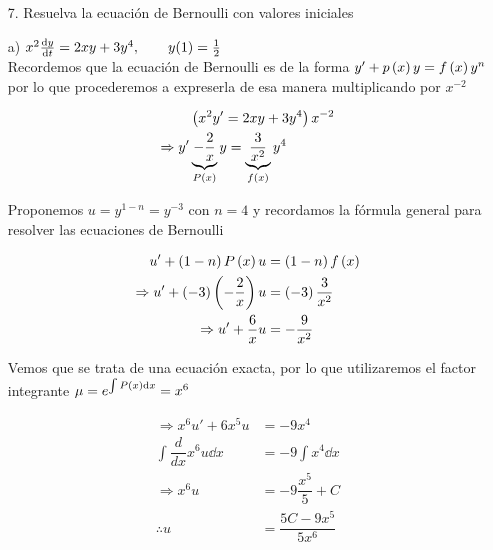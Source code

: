 \begin{enumerate}
    \item[7.] Resuelva la ecuación de Bernoulli con valores iniciales
\end{enumerate}
  
   \begin{itemize}
       \item[a)]   $x^{2} \dv{y}{t} = 2xy + 3y^{4}, \qquad y(1)=\frac{1}{2}$\\
       Recordemos que la ecuación de Bernoulli es de la forma $y'+p\left( x \right)y=f\left( x \right)y^n$ por lo que procederemos a expreserla de esa manera multiplicando por $x^{-2}$
       
       \begin{align*}
           &\left(x^2 y' = 2xy+3y^4\right)x^{-2} \\
           \Rightarrow y'&\underbrace{-\dfrac{2}{x}}_{P(x)}y=\underbrace{\dfrac{3}{x^2}}_{f\left( x \right)}y^4
       \end{align*}
       
       Proponemos $u=y^{1-n}=y^{-3}$ con $n=4$ y recordamos la fórmula general para resolver las ecuaciones de Bernoulli
       
       \begin{align*}
           u'+\left( 1-n \right)P\left( x \right) u &= \left( 1-n \right)f\left( x \right) \\
           \Rightarrow u' + \left( -3 \right) \left( -\dfrac{2}{x} \right)u&=\left( -3 \right)\dfrac{3}{x^2} \\
           \Rightarrow u'+\dfrac{6}{x} u &= -\dfrac{9}{x^2}
       \end{align*}
       
       Vemos que se trata de una ecuación exacta, por lo que utilizaremos el factor integrante $\mu=e^{\int P\left( x \right) \dd x}=x^6$

    \begin{align*}
        \Rightarrow  x^6u'+6x^5u&=-9x^4 \\ 
        \int \dfrac{d}{dx} x^6 u \dd x &= -9\int x^4 \dd x \\
        \Rightarrow x^6 u &= -9 \dfrac{x^5}{5} + C \\ 
        \therefore u&= \dfrac{5C-9x^5}{5x^6}
    \end{align*}       
    

\end{itemize}
